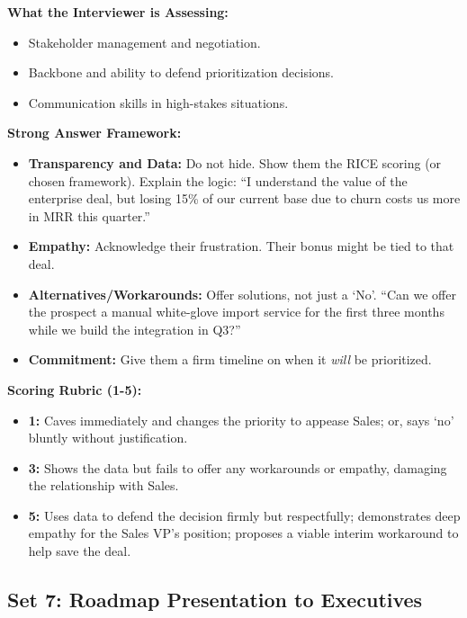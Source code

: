 \textbf{What the Interviewer is Assessing:}

\begin{itemize}
\tightlist
\item
  Stakeholder management and negotiation.
\item
  Backbone and ability to defend prioritization decisions.
\item
  Communication skills in high-stakes situations.
\end{itemize}

\textbf{Strong Answer Framework:}

\begin{itemize}
\tightlist
\item
  \textbf{Transparency and Data:} Do not hide. Show them the RICE
  scoring (or chosen framework). Explain the logic: ``I understand the
  value of the enterprise deal, but losing 15\% of our current base due
  to churn costs us more in MRR this quarter.''
\item
  \textbf{Empathy:} Acknowledge their frustration. Their bonus might be
  tied to that deal.
\item
  \textbf{Alternatives/Workarounds:} Offer solutions, not just a `No'.
  ``Can we offer the prospect a manual white-glove import service for
  the first three months while we build the integration in Q3?''
\item
  \textbf{Commitment:} Give them a firm timeline on when it \emph{will}
  be prioritized.
\end{itemize}

\textbf{Scoring Rubric (1-5):}

\begin{itemize}
\tightlist
\item
  \textbf{1:} Caves immediately and changes the priority to appease
  Sales; or, says `no' bluntly without justification.
\item
  \textbf{3:} Shows the data but fails to offer any workarounds or
  empathy, damaging the relationship with Sales.
\item
  \textbf{5:} Uses data to defend the decision firmly but respectfully;
  demonstrates deep empathy for the Sales VP's position; proposes a
  viable interim workaround to help save the deal.
\end{itemize}

\bigskip

\subsection{Set 7: Roadmap Presentation to
Executives}\label{set-7-roadmap-presentation-to-executives}

